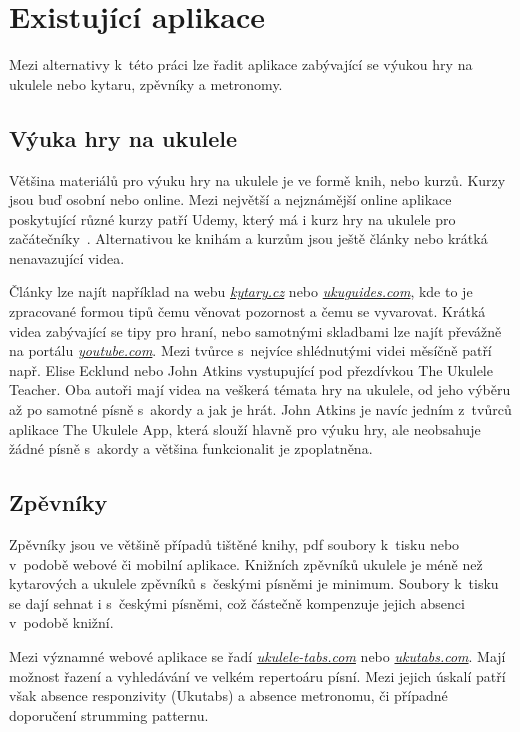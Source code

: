 \section{Existující aplikace}
\label{sc:existing_apps}
Mezi alternativy k~této práci lze řadit aplikace zabývající se výukou hry na ukulele nebo kytaru, zpěvníky a metronomy.

\subsection{Výuka hry na ukulele}
\label{ss:existing_teaching_apps}
Většina materiálů pro výuku hry na ukulele je ve formě knih, nebo kurzů.
Kurzy jsou buď osobní nebo online. Mezi největší a nejznámější online aplikace poskytující různé kurzy patří Udemy, který má i kurz hry na ukulele pro začátečníky~\cite{puchmayr_complete}. Alternativou ke knihám a kurzům jsou ještě články nebo krátká nenavazující videa.

Články lze najít například na webu \href{www.kytary.cz}{\emph{kytary.cz}} nebo \href{www.ukuguides.com}{\emph{ukuguides.com}}, kde to je zpracované formou tipů čemu věnovat pozornost a čemu se vyvarovat. Krátká videa zabývající se tipy pro hraní, nebo samotnými skladbami lze najít převážně na portálu \href{www.youtube.com}{\emph{youtube.com}}. Mezi tvůrce s~nejvíce shlédnutými videi měsíčně patří např. Elise Ecklund nebo John Atkins vystupující pod přezdívkou The Ukulele Teacher. Oba autoři mají videa na veškerá témata hry na ukulele, od jeho výběru až po samotné písně s~akordy a jak je hrát. John Atkins je navíc jedním z~tvůrců aplikace The Ukulele App, která slouží hlavně pro výuku hry, ale neobsahuje žádné písně s~akordy a většina funkcionalit je zpoplatněna.

\subsection{Zpěvníky}
\label{ss:songbooks}
Zpěvníky jsou ve většině případů tištěné knihy, pdf soubory k~tisku nebo v~podobě webové či mobilní aplikace. Knižních zpěvníků ukulele je méně než kytarových a ukulele zpěvníků s~českými písněmi je minimum. Soubory k~tisku se dají sehnat i s~českými písněmi, což částečně kompenzuje jejich absenci v~podobě knižní.

Mezi významné webové aplikace se řadí \href{www.ukulele-tabs.com}{\emph{ukulele-tabs.com}} nebo \href{www.ukutabs.com}{\emph{ukutabs.com}}. Mají možnost řazení a vyhledávání ve velkém repertoáru písní. Mezi jejich úskalí patří však absence responzivity (Ukutabs) a absence metronomu, či případné doporučení strumming patternu.

